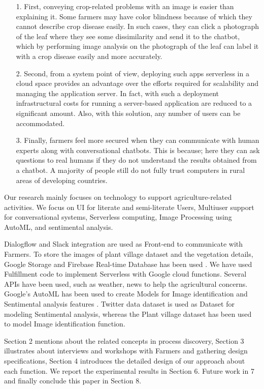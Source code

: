 \documentclass[10pt,conference]{IEEEtran}
\begin{document}
\begin{itemize}
	\item[1.]  First, conveying crop-related problems with an image is easier than explaining it. Some farmers may have color blindness because of which they cannot describe crop disease easily. In such cases, they can click a photograph of the leaf where they see some dissimilarity and send it to the chatbot, which by performing image analysis on the photograph of the leaf can label it with a crop disease easily and more accurately. 
	\item[2.] Second, from a system point of view, deploying such apps serverless in a cloud space provides an advantage over the efforts required for scalability and managing the application server. In fact, with such a deployment infrastructural costs for running a server-based application are reduced to a significant amount. Also, with this solution, any number of users can be accommodated. 
	\item[3.] Finally, farmers feel more secured when they can communicate with human experts along with conversational chatbots. This is because; here they can ask questions to real humans if they do not understand the results obtained from a chatbot. A majority of people still do not fully trust computers in rural areas of developing countries.

\end{itemize}

{\raggedright
Our research mainly focuses on technology to support agriculture-related activities. We focus on UI for literate and semi-literate Users, Multiuser support for conversational systems, Serverless computing, Image Processing using AutoML, and sentimental analysis.
}


{\raggedright
Dialogflow and Slack integration are used as Front-end to communicate with Farmers. To store the images of plant village dataset and the vegetation details, Google Storage and Firebase Real-time Database has been used . We have used Fulfillment code to implement Serverless with Google cloud functions. Several APIs have been used, such as weather, news to help the agricultural concerns. Google's AutoML has been used to create Models for Image identification and Sentimental analysis features \cite{sauglam2016developing}. Twitter data dataset is used as Dataset for modeling Sentimental analysis, whereas the Plant village dataset has been used to model Image identification function.
}

{\raggedright
Section 2 mentions about the related concepts in process discovery, Section 3 illustrates about interviews and workshops with Farmers and gathering design specifications, Section 4 introduces the detailed design of our approach about each function. We report the experimental results in Section 6. Future work in 7 and finally conclude this paper in Section 8. \newline\newline
}
\end{document}
